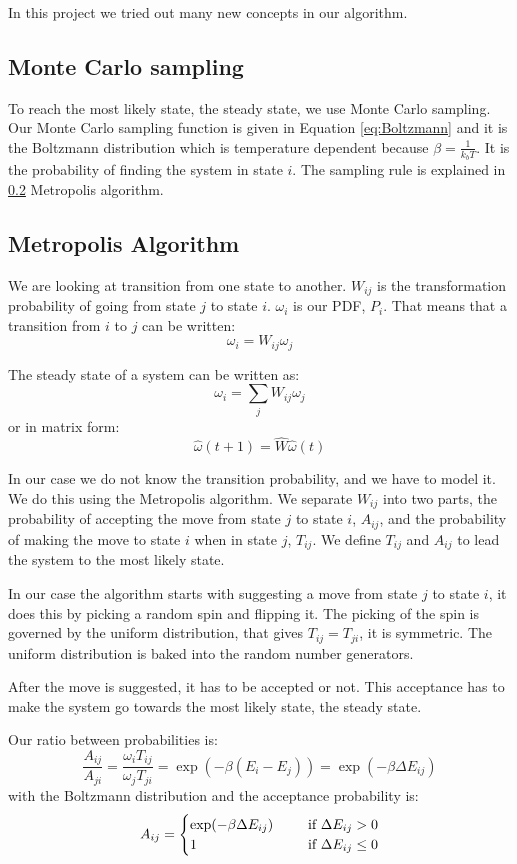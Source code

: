 In this project we tried out many new concepts in our algorithm.


\subsection{Monte Carlo sampling}

To reach the most likely state, the steady state, we use Monte Carlo sampling. Our Monte Carlo sampling function is given in Equation \ref{eq:Boltzmann} and it is the Boltzmann distribution which is temperature dependent because $\beta = \frac{1}{k_b T}$. It is the probability of finding the system in state $i$. The sampling rule is explained in \ref{sec:metropolis} Metropolis algorithm.

\subsection{Metropolis Algorithm}\label{sec:metropolis}

We are looking at transition from one state to another. $W_{ij}$ is the transformation probability of going from state $j$ to state $i$. $\omega_i$ is our PDF, $P_i$. That means that a transition from $i$ to $j$ can be written:
\[
\omega_i = W_{ij}\omega_j
\]

The steady state of a system can be written as:
\[
\omega_i = \sum_j W_{ij}\omega_{j}
\]
or in matrix form:
\[
\hat{\omega}(t+1) = \hat{W}\hat{\omega}(t)
\]

In our case we do not know the transition probability, and we have to model it. We do this using the Metropolis algorithm. We separate $W_{ij}$ into two parts, the probability of accepting the move from state $j$ to state $i$, $A_{ij}$, and the probability of making the move to state $i$ when in state $j$, $T_{ij}$. We define $T_{ij}$ and $A_{ij}$ to lead the system to the most likely state.

In our case the algorithm starts with suggesting a move from state $j$ to state $i$, it does this by picking a random spin and flipping it. The picking of the spin is governed by the uniform distribution, that gives $T_{ij }= T_{ji}$, it is symmetric. The uniform distribution is baked into the random number generators.

After the move is suggested, it has to be accepted or not. This acceptance has to make the system go towards the most likely state, the steady state.

Our ratio between probabilities is:
\[
\frac{A_{ij}}{A_{ji}} = \frac{\omega_iT_{ij}}{\omega_jT_{ji}} = \exp(-\beta (E_i-E_j))= \exp(-\beta \Delta E_{ij})
\]
with the Boltzmann distribution and the acceptance probability is:
\[
A_{ij} = \begin{cases}
\exp(-\beta \Delta E_{ij}) &\indent \text{if } \Delta E_{ij} > 0\\
1 & \indent\text{if } \Delta E_{ij} \leq 0\\
\end{cases}
\]

